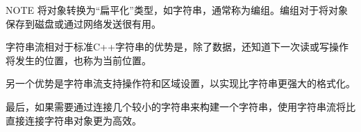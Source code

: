 \begin{myNotic}{NOTE}
将对象转换为“扁平化”类型，如字符串，通常称为编组。编组对于将对象保存到磁盘或通过网络发送很有用。
\end{myNotic}

字符串流相对于标准C++字符串的优势是，除了数据，还知道下一次读或写操作将发生的位置，也称为当前位置。

另一个优势是字符串流支持操作符和区域设置，以实现比字符串更强大的格式化。

最后，如果需要通过连接几个较小的字符串来构建一个字符串，使用字符串流将比直接连接字符串对象更为高效。
